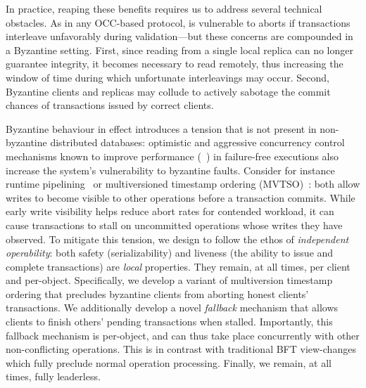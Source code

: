 In practice, reaping these benefits requires us to address several
technical obstacles. As in any OCC-based protocol, \sys
is vulnerable to aborts if transactions interleave unfavorably during
validation---but these concerns are compounded in a Byzantine
setting. First, since reading from a single local replica can no
longer guarantee integrity, it becomes necessary to read remotely,
thus increasing the window of time during which unfortunate
interleavings may occur. Second, Byzantine clients and replicas may
collude to actively sabotage the commit chances of transactions issued
by correct clients. 

Byzantine behaviour in effect introduces a tension that is not present in non-byzantine
distributed databases: optimistic and aggressive concurrency control mechanisms known
to improve performance (~\cite{kung1981occ,bernstein1983mcc,reed1983atomic,xie2015callas,zhang2015tapir}) in failure-free executions also increase the system's vulnerability to byzantine faults. Consider for instance runtime pipelining~\cite{xie2015callas,su2017tebaldi} or multiversioned timestamp ordering (MVTSO)~\cite{bernstein1983mcc,reed1983atomic}: both allow writes to become visible to other operations before a transaction commits. While early write visibility helps reduce abort rates for
contended workload, it can cause transactions to stall on uncommitted operations
whose writes they have observed. To mitigate this tension, we design \sys{} to
follow the ethos of \textit{independent operability}: both safety
(serializability) and liveness (the ability to issue and complete transactions)
are \textit{local} properties. They remain, at all times, per client and
per-object. 
Specifically, we develop a variant of multiversion timestamp
ordering that precludes byzantine clients from aborting honest clients'
transactions. We additionally develop a novel \textit{fallback} mechanism that
allows clients to finish others' pending transactions when stalled. Importantly, this fallback mechanism is per-object, and can thus take place concurrently with other non-conflicting operations. This is in contrast with traditional BFT view-changes which fully preclude normal operation processing.  Finally, we remain, at all times, fully leaderless.

